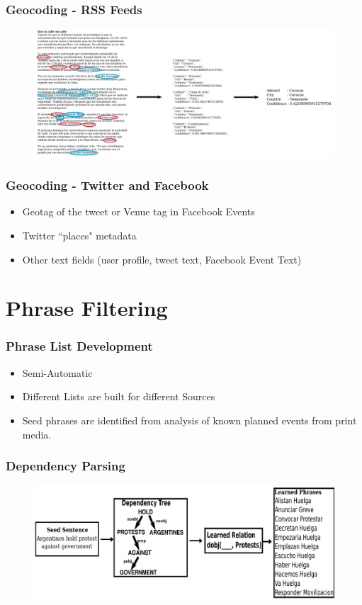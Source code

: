 \documentclass[red,handout]{beamer}
\begin{document}
\begin{frame}
\frametitle{Geocoding - RSS Feeds}
\begin{figure}
    \centering
    \includegraphics[width=\textwidth]{psl_pipeline2}
\end{figure}
\end{frame}


\begin{frame}
\frametitle{Geocoding - Twitter and Facebook}
    \begin{itemize}[<+->]
        \item
            Geotag of the tweet or Venue tag in Facebook Events
        \item
            Twitter ``places" metadata
        \item
            Other text fields (user profile, tweet text, Facebook Event Text)
    \end{itemize}
\end{frame}

\section{Phrase Filtering}
\begin{frame}
\frametitle{Phrase List Development}
    \begin{itemize}[<+->]
        \item
            Semi-Automatic
        \item
            Different Lists are built for different Sources
        \item
            Seed phrases are identified from analysis of known planned events from print media.
    \end{itemize}

\end{frame}

\begin{frame}
    \frametitle{Dependency Parsing}
    \begin{figure}
        \includegraphics[width=\textwidth]{phraseLearning}
    \end{figure}
\end{frame}
\end{document}

